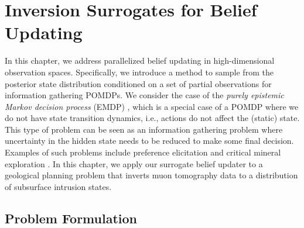 \chapter{Inversion Surrogates for Belief Updating}\label{ch:ivae}

In this chapter, we address parallelized belief updating in high-dimensional observation spaces.
Specifically, we introduce a method to sample from the posterior state distribution conditioned on a set of partial observations for information gathering POMDPs.
We consider the case of the \textit{purely epistemic Markov decision process} (EMDP) \cite{sabbadin2007emdp}, which is a special case of a POMDP where we do not have state transition dynamics, i.e., actions do not affect the (static) state.
This type of problem can be seen as an information gathering problem where uncertainty in the hidden state needs to be reduced to make some final decision.
Examples of such problems include preference elicitation \cite{sabbadin2007emdp} and critical mineral exploration \cite{mern2023intelligent}.
In this chapter, we apply our surrogate belief updater to a geological planning problem that inverts muon tomography data \cite{morishima2017discovery} to a distribution of subsurface intrusion states. 

\section{Problem Formulation}


